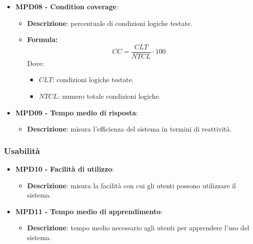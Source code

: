 \documentclass[10pt]{article}
\begin{document}
\begin{justify}
\begin{itemize}
    \item \textbf{MPD08 - Condition coverage}:
    \begin{itemize}
        \item   \textbf{Descrizione}: percentuale di condizioni logiche testate.
        \item   \textbf{Formula:}
            \[
            CC = \frac{CLT}{NTCL} \cdot 100
            \]
            Dove:
            \begin{itemize}
                \item $CLT$: condizioni logiche testate.
                \item $NTCL$: numero totale condizioni logiche.
            \end{itemize}
    \end{itemize}

    \item \textbf{MPD09 - Tempo medio di risposta}:
    \begin{itemize}
        \item \textbf{Descrizione}: misura l'efficienza del sistema in termini di reattività.
    \end{itemize}
\end{itemize}

\subsubsection{Usabilità}
\begin{itemize}
    \item \textbf{MPD10 - Facilità di utilizzo}:
        \begin{itemize}
            \item \textbf{Descrizione}:  misura la facilità con cui gli utenti possono utilizzare il sistema.
        \end{itemize}
    \item \textbf{MPD11 - Tempo medio di apprendimento}:
        \begin{itemize}
            \item \textbf{Descrizione}: tempo medio necessario agli utenti per apprendere l'uso del sistema.
        \end{itemize}
\end{itemize}


\end{justify}
\end{document}

